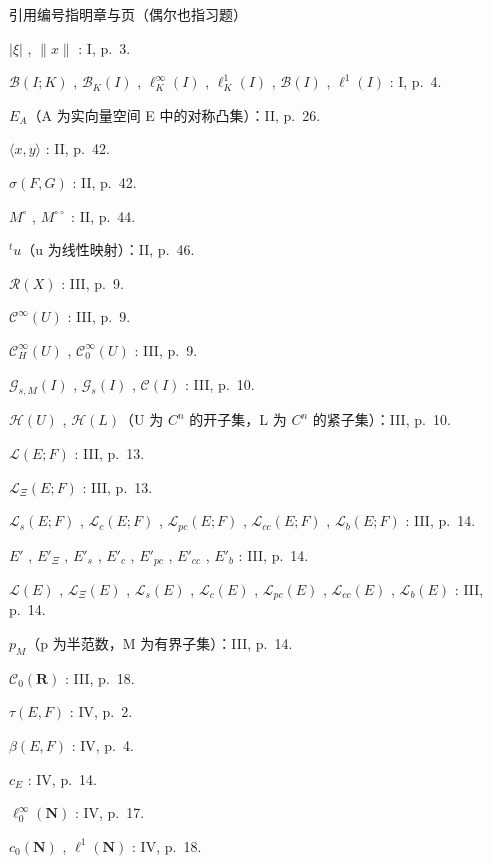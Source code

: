 
引用编号指明章与页（偶尔也指习题）

\(|\xi|\) , \(\|x\|\) : I, p.~3.

\(\mathcal{B}(I; K)\) , \(\mathcal{B}_{K}(I)\) , \(\ell_{K}^{\infty}(I)\) , \(\ell_{K}^{1}(I)\) , \(\mathcal{B}(I)\) , \(\ell^{1}(I)\) : I, p.~4.

\(E_{A}\)（A 为实向量空间 E 中的对称凸集）：II, p.~26.

\(\langle x, y \rangle\) : II, p.~42.

\(\sigma(F, G)\) : II, p.~42.

\(M^{\circ}\) , \(M^{\circ\circ}\) : II, p.~44.

\(^{t}u\)（u 为线性映射）：II, p.~46.

\(\mathcal{R}(X)\) : III, p.~9.

\(\mathcal{C}^{\infty}(U)\) : III, p.~9.

\(\mathcal{C}_{H}^{\infty}(U)\) , \(\mathcal{C}_{0}^{\infty}(U)\) : III, p.~9.

\(\mathcal{G}_{s,M}(I)\) , \(\mathcal{G}_{s}(I)\) , \(\mathcal{C}(I)\) : III, p.~10.

\(\mathcal{H}(U)\) , \(\mathcal{H}(L)\)（U 为 \(C^{n}\) 的开子集，L 为 \(C^{n}\) 的紧子集）：III, p.~10.

\(\mathcal{L}(E; F)\) : III, p.~13.

\(\mathcal{L}_{\Xi}(E; F)\) : III, p.~13.

\(\mathcal{L}_{s}(E; F)\) , \(\mathcal{L}_{c}(E; F)\) , \(\mathcal{L}_{pc}(E; F)\) , \(\mathcal{L}_{cc}(E; F)\) , \(\mathcal{L}_{b}(E; F)\) : III, p.~14.

\(E'\) , \(E'_{\Xi}\) , \(E'_{s}\) , \(E'_{c}\) , \(E'_{pc}\) , \(E'_{cc}\) , \(E'_{b}\) : III, p.~14.

\(\mathcal{L}(E)\) , \(\mathcal{L}_{\Xi}(E)\) , \(\mathcal{L}_{s}(E)\) , \(\mathcal{L}_{c}(E)\) , \(\mathcal{L}_{pc}(E)\) , \(\mathcal{L}_{cc}(E)\) , \(\mathcal{L}_{b}(E)\) : III, p.~14.

\(p_{M}\)（p 为半范数，M 为有界子集）：III, p.~14.

\(\mathcal{C}_{0}(\mathbf{R})\) : III, p.~18.

\(\tau(E, F)\) : IV, p.~2.

\(\beta(E, F)\) : IV, p.~4.

\(c_{E}\) : IV, p.~14.

\(\ell_{0}^{\infty}(\mathbf{N})\) : IV, p.~17.

\(c_{0}(\mathbf{N})\) , \(\ell^{1}(\mathbf{N})\) : IV, p.~18.

